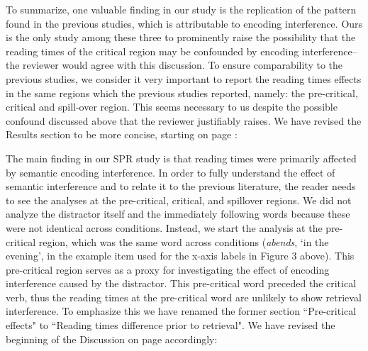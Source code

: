 \documentclass[12pt]{article}
\begin{document}
\begin{quote}
\end{quote}

To summarize, one valuable finding in our study is the replication of the pattern found in the previous studies, which is attributable to encoding interference. Ours is the only study among these three to prominently raise the possibility that the reading times of the critical region may be confounded by encoding interference--the reviewer would agree with this discussion. To ensure comparability to the previous studies, we consider it very important to report the reading times effects in the same regions which the previous studies reported, namely: the pre-critical, critical and spill-over region. This seems necessary to us despite the possible confound discussed above that the reviewer justifiably raises. We have revised the Results section to be more concise, starting on page \pageref{revised_SPR}: 

\begin{quote}
\end{quote}

The main finding in our SPR study is that reading times were primarily affected by semantic encoding interference.  In order to fully understand the effect of semantic interference and to relate it to the previous literature, the reader needs to see the analyses at the pre-critical, critical, and spillover regions. We did not analyze the distractor itself and the immediately following words because these were not identical across conditions. Instead, we start the analysis at the pre-critical region, which was the same word across conditions (\textit{abends}, `in the evening', in the example item used for the x-axis labels in Figure 3 above). This pre-critical region serves as a proxy for investigating the effect of encoding interference caused by the distractor. This pre-critical word preceded the critical verb, thus the reading times at the pre-critical word are unlikely to show retrieval interference. To emphasize this we have renamed the former section ``Pre-critical effects" to ``Reading times difference prior to retrieval". We have revised the beginning of the Discussion on page \pageref{prior_to_retrieval} accordingly: 

\begin{quote}
\end{quote}
\end{document}
